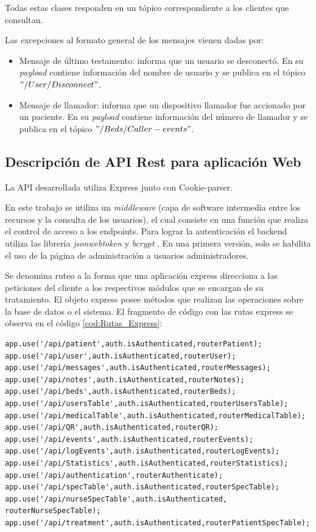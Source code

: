 Todas estas clases responden en un tópico correspondiente a los clientes que consultan.

Las excepciones al formato general de los mensajes vienen dadas por:
\begin{itemize}
\item Mensaje de último testamento: informa que un usuario se desconectó. En su \textit{payload} contiene información del nombre de usuario y se publica en el tópico $"/User/Disconnect"$.
\item Mensaje de llamador: informa que un dispositivo llamador fue accionado por un paciente. En su \textit{payload} contiene información del número de llamador y se publica en el tópico $"/Beds/Caller-events"$.

\end{itemize}


\subsection{Descripción de API Rest para aplicación Web}
\label{Descripción de API Rest para aplicación Web}

La API desarrollada utiliza Express junto con Cookie-parser. 
 
En este trabajo se utiliza un \textit{middleware} (capa de software intermedia entre los recursos y la consulta de los usuarios), el cual consiste en una función que realiza el control de acceso a los endpoints. Para lograr la autenticación el backend utiliza las librería \textit{jsonwebtoken} \citep{WEBSITE:32} y \textit{bcrypt} \citep{WEBSITE:31}. En una primera versión, solo se habilita el uso de la página de administración a usuarios administradores.

Se denomina ruteo a la forma que una aplicación express direcciona a las peticiones del cliente a los respectivos módulos que se encargan de su tratamiento.%
El objeto express posee métodos que realizan las operaciones sobre la base de datos o el sistema. El fragmento de código con las rutas express se observa en el código \ref{cod:Rutas_Express}:

\begin{lstlisting}[label=cod:Rutas_Express,caption=  Rutas express.]
app.use('/api/patient',auth.isAuthenticated,routerPatient);
app.use('/api/user',auth.isAuthenticated,routerUser);
app.use('/api/messages',auth.isAuthenticated,routerMessages);
app.use('/api/notes',auth.isAuthenticated,routerNotes);
app.use('/api/beds',auth.isAuthenticated,routerBeds);
app.use('/api/usersTable',auth.isAuthenticated,routerUsersTable);
app.use('/api/medicalTable',auth.isAuthenticated,routerMedicalTable);
app.use('/api/QR',auth.isAuthenticated,routerQR);
app.use('/api/events',auth.isAuthenticated,routerEvents);
app.use('/api/logEvents',auth.isAuthenticated,routerLogEvents);
app.use('/api/Statistics',auth.isAuthenticated,routerStatistics);
app.use('/api/authentication',routerAuthenticate);
app.use('/api/specTable',auth.isAuthenticated,routerSpecTable);
app.use('/api/nurseSpecTable',auth.isAuthenticated,  routerNurseSpecTable);
app.use('/api/treatment',auth.isAuthenticated,routerPatientSpecTable);
\end{lstlisting}

